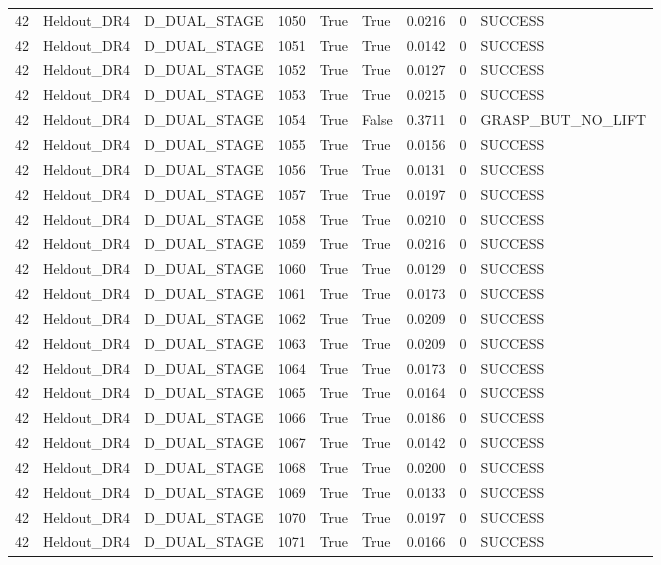 \documentclass[11pt,a4paper,oneside]{book}
\begin{document}
\begin{longtable}{l l l l l l l l l}
42 & Heldout\_DR4 & D\_DUAL\_STAGE & 1050 & True & True & 0.0216 & 0 & SUCCESS \\
42 & Heldout\_DR4 & D\_DUAL\_STAGE & 1051 & True & True & 0.0142 & 0 & SUCCESS \\
42 & Heldout\_DR4 & D\_DUAL\_STAGE & 1052 & True & True & 0.0127 & 0 & SUCCESS \\
42 & Heldout\_DR4 & D\_DUAL\_STAGE & 1053 & True & True & 0.0215 & 0 & SUCCESS \\
42 & Heldout\_DR4 & D\_DUAL\_STAGE & 1054 & True & False & 0.3711 & 0 & GRASP\_BUT\_NO\_LIFT \\
42 & Heldout\_DR4 & D\_DUAL\_STAGE & 1055 & True & True & 0.0156 & 0 & SUCCESS \\
42 & Heldout\_DR4 & D\_DUAL\_STAGE & 1056 & True & True & 0.0131 & 0 & SUCCESS \\
42 & Heldout\_DR4 & D\_DUAL\_STAGE & 1057 & True & True & 0.0197 & 0 & SUCCESS \\
42 & Heldout\_DR4 & D\_DUAL\_STAGE & 1058 & True & True & 0.0210 & 0 & SUCCESS \\
42 & Heldout\_DR4 & D\_DUAL\_STAGE & 1059 & True & True & 0.0216 & 0 & SUCCESS \\
42 & Heldout\_DR4 & D\_DUAL\_STAGE & 1060 & True & True & 0.0129 & 0 & SUCCESS \\
42 & Heldout\_DR4 & D\_DUAL\_STAGE & 1061 & True & True & 0.0173 & 0 & SUCCESS \\
42 & Heldout\_DR4 & D\_DUAL\_STAGE & 1062 & True & True & 0.0209 & 0 & SUCCESS \\
42 & Heldout\_DR4 & D\_DUAL\_STAGE & 1063 & True & True & 0.0209 & 0 & SUCCESS \\
42 & Heldout\_DR4 & D\_DUAL\_STAGE & 1064 & True & True & 0.0173 & 0 & SUCCESS \\
42 & Heldout\_DR4 & D\_DUAL\_STAGE & 1065 & True & True & 0.0164 & 0 & SUCCESS \\
42 & Heldout\_DR4 & D\_DUAL\_STAGE & 1066 & True & True & 0.0186 & 0 & SUCCESS \\
42 & Heldout\_DR4 & D\_DUAL\_STAGE & 1067 & True & True & 0.0142 & 0 & SUCCESS \\
42 & Heldout\_DR4 & D\_DUAL\_STAGE & 1068 & True & True & 0.0200 & 0 & SUCCESS \\
42 & Heldout\_DR4 & D\_DUAL\_STAGE & 1069 & True & True & 0.0133 & 0 & SUCCESS \\
42 & Heldout\_DR4 & D\_DUAL\_STAGE & 1070 & True & True & 0.0197 & 0 & SUCCESS \\
42 & Heldout\_DR4 & D\_DUAL\_STAGE & 1071 & True & True & 0.0166 & 0 & SUCCESS \\

\end{longtable}
\end{document}
